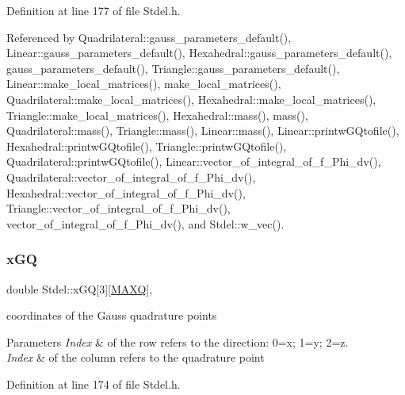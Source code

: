 Definition at line 177 of file Stdel.\+h.



Referenced by Quadrilateral\+::gauss\+\_\+parameters\+\_\+default(), Linear\+::gauss\+\_\+parameters\+\_\+default(), Hexahedral\+::gauss\+\_\+parameters\+\_\+default(), gauss\+\_\+parameters\+\_\+default(), Triangle\+::gauss\+\_\+parameters\+\_\+default(), Linear\+::make\+\_\+local\+\_\+matrices(), make\+\_\+local\+\_\+matrices(), Quadrilateral\+::make\+\_\+local\+\_\+matrices(), Hexahedral\+::make\+\_\+local\+\_\+matrices(), Triangle\+::make\+\_\+local\+\_\+matrices(), Hexahedral\+::mass(), mass(), Quadrilateral\+::mass(), Triangle\+::mass(), Linear\+::mass(), Linear\+::printw\+G\+Qtofile(), Hexahedral\+::printw\+G\+Qtofile(), Triangle\+::printw\+G\+Qtofile(), Quadrilateral\+::printw\+G\+Qtofile(), Linear\+::vector\+\_\+of\+\_\+integral\+\_\+of\+\_\+f\+\_\+\+Phi\+\_\+dv(), Quadrilateral\+::vector\+\_\+of\+\_\+integral\+\_\+of\+\_\+f\+\_\+\+Phi\+\_\+dv(), Hexahedral\+::vector\+\_\+of\+\_\+integral\+\_\+of\+\_\+f\+\_\+\+Phi\+\_\+dv(), Triangle\+::vector\+\_\+of\+\_\+integral\+\_\+of\+\_\+f\+\_\+\+Phi\+\_\+dv(), vector\+\_\+of\+\_\+integral\+\_\+of\+\_\+f\+\_\+\+Phi\+\_\+dv(), and Stdel\+::w\+\_\+vec().

\mbox{\label{classStdel_adedcb4d4faa12adf348054780a3b2c1a}} 
\subsubsection{\texorpdfstring{x\+GQ}{xGQ}}
{\footnotesize\ttfamily double Stdel\+::x\+GQ\mbox{[}3\mbox{]}\mbox{[}\hyperlink{MyOptions_8h_af708e94d886ba3f59582612949cac702}{M\+A\+XQ}\mbox{]}\hspace{0.3cm}{\ttfamily [protected]}, {\ttfamily [inherited]}}

coordinates of the Gauss quadrature points 
\begin{DoxyParams}{Parameters}
{\em Index} & of the row refers to the direction\+: 0=x; 1=y; 2=z. \\
\hline
{\em Index} & of the column refers to the quadrature point \\
\hline
\end{DoxyParams}


Definition at line 174 of file Stdel.\+h.



